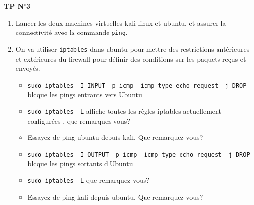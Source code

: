 \documentclass{article}
\newcommand{\tit}[1]{
\begin{center}
    \Large{\textbf{{#1}}}
\end{center}
}
\begin{document}
\tit{TP N\(^{\boldsymbol{\circ}}\)\hspace{0.1cm}3}

\vspace{0.5cm}
\begin{enumerate}
    \item Lancer les deux machines virtuelles kali linux et ubuntu, et assurer la connectivité avec la commande \texttt{ping}.
    \item On va utiliser \texttt{iptables} dans ubuntu pour mettre des restrictions antérieures et extérieures du firewall pour définir des 
        conditions sur les paquets reçus et envoyés.
\begin{itemize}
    \item \texttt{sudo iptables -I INPUT -p icmp --icmp-type echo-request -j DROP} bloque les pings entrants vers Ubuntu
    \item \texttt{sudo iptables -L} affiche toutes les règles iptables actuellement configurées , que remarquez-vous?
    \item Essayez de ping ubuntu depuis kali. Que remarquez-vous? 
    \item \texttt{sudo iptables -I OUTPUT -p icmp --icmp-type echo-request -j DROP} bloque les pings sortants d'Ubuntu
    \item \texttt{sudo iptables -L} que remarquez-vous? 
    \item Essayez de ping kali depuis ubuntu. Que remarquez-vous? 
\end{itemize}
\end{enumerate}
\end{document}
